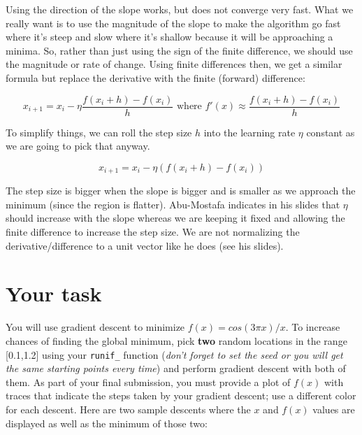 \begin{fullwidth}
Using the direction of the slope works, but does not converge very fast. What we really want is to use the magnitude of the slope to make the algorithm go fast where it's steep and slow where it's shallow because it will be approaching a minima. So, rather than just using the sign of the finite difference, we should use the magnitude or rate of change. Using finite differences then, we get a similar formula but replace the derivative with the finite (forward) difference:

\[
x _{i+1} = x_i - \eta \frac{f(x_{i}+h) - f(x_{i})}{h} \text{ where } f'(x) \approx \frac{f(x_{i}+h) - f(x_{i})}{h}
\]

\noindent To simplify things, we can roll the step size $h$ into the learning rate $\eta$ constant as we are going to pick that anyway.

\[
x _{i+1} = x_i - \eta (f(x_{i}+h) - f(x_{i}))
\]

\noindent  The step size is bigger when the slope is bigger and is smaller as we approach the minimum (since the region is flatter). Abu-Mostafa indicates in his slides that $\eta$ should increase with the slope whereas we are keeping it fixed and allowing the finite difference to increase the step size. We are not normalizing the derivative/difference to a unit vector like he does (see his slides).

\section{Your task}

You will use gradient descent to minimize $f(x) = cos(3\pi x) / x$. To increase chances of finding the global minimum, pick {\bf two} random locations in the range [0.1,1.2] using your {\tt runif\_} function ({\em don't forget to set the seed or you will get the same starting points every time}) and perform gradient descent with both of them. As part of your final submission, you must provide a plot of $f(x)$ with traces that indicate the steps taken by your gradient descent; use a different color for each descent. Here are two sample descents where the $x$ and $f(x)$ values are displayed as well as the minimum of those two:


\end{fullwidth}
